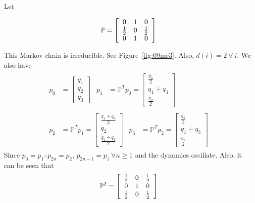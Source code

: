 \begin{example}
Let

\begin{equation*}
\mathbb{P} = \left[\begin{array}{c c c} 0 & 1 & 0 \\ \frac{1}{2} & 0 & \frac{1}{2} \\ 0 & 1 & 0 \end{array}\right]
\end{equation*}

This Markov chain is irreducible.
See Figure~\ref{fig:09mc3}.
Also, $d (i)=2~\forall~i$.
We also have
\begin{align*}
\begin{split}
p_0 &= \left[\begin{array}{c} q_1 \\ q_2 \\ q_3 \end{array}\right]
\end{split}
\begin{split}
p_1 &= \mathbb{P}^Tp_0 = \left[\begin{array}{c} \frac{q_2}{2} \\ q_1+q_3 \\ \frac{q_2}{2} \end{array}\right]
\end{split} \\
\begin{split}
p_2 &= \mathbb{P}^Tp_1 = \left[\begin{array}{c} \frac{q_1+q_3}{2} \\ q_2 \\ \frac{q_1+q_3}{2} \end{array}\right]
\end{split}
\begin{split}
p_3 &= \mathbb{P}^Tp_2 = \left[\begin{array}{c} \frac{q_2}{2} \\ q_1+q_3 \\ \frac{q_2}{2} \end{array}\right]
\end{split}
\end{align*}
Since $p_3=p_1 \therefore p_{2n}=p_2$, $p_{2n-1}=p_1~\forall n\geq1$ and the dynamics oscillate.
Also, it can be seen that
\begin{align*}
\begin{split}
\mathbb{P}^2 = \left[\begin{array}{c c c} \frac{1}{2} & 0 & \frac{1}{2} \\ 0 & 1 & 0 \\ \frac{1}{2} & 0 & \frac{1}{2} \end{array}\right]

\end{split}
\end{align*}
\end{example}
